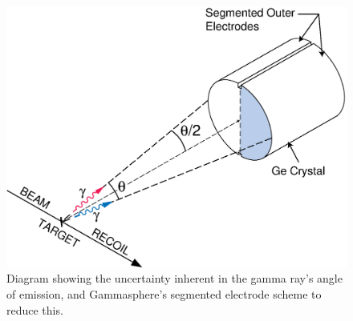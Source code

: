 \begin{figure}
	\centerline{\includegraphics[height=0.3\textheight]{./img/c3/split_contact.eps}}
	\caption{Diagram showing the uncertainty inherent in the gamma ray's angle of emission, and Gammasphere's segmented electrode scheme to reduce this.}
	\label{fig:chp3-doppler-split-contact}
\end{figure}

